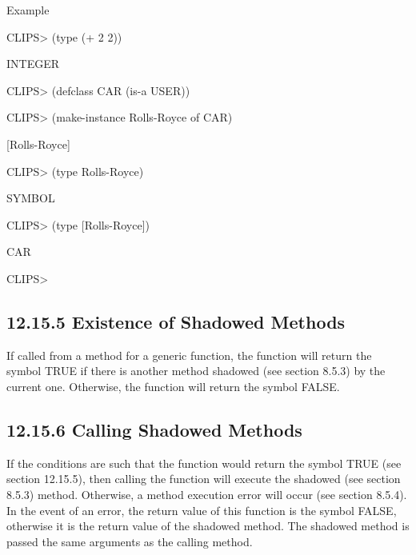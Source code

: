 \documentclass[letterpaper,10pt,english]{sphinxmanual}
\begin{document}

\begin{sphinxVerbatim}[commandchars=\\\{\}]
 
\end{sphinxVerbatim}

Example

CLIPS\textgreater{} (type (+ 2 2))

INTEGER

CLIPS\textgreater{} (defclass CAR (is-a USER))

CLIPS\textgreater{} (make-instance Rolls-Royce of CAR)

{[}Rolls-Royce{]}

CLIPS\textgreater{} (type Rolls-Royce)

SYMBOL

CLIPS\textgreater{} (type {[}Rolls-Royce{]})

CAR

CLIPS\textgreater{}


\subsection{12.15.5 Existence of Shadowed Methods}
\label{\detokenize{actions:existence-of-shadowed-methods}}
If called from a method for a generic function, the function
 will return the symbol TRUE if there is another method
shadowed (see section 8.5.3) by the current one. Otherwise, the function
will return the symbol FALSE.


\begin{sphinxVerbatim}[commandchars=\\\{\}]
\end{sphinxVerbatim}


\subsection{12.15.6 Calling Shadowed Methods}
\label{\detokenize{actions:calling-shadowed-methods}}
If the conditions are such that the function  would
return the symbol TRUE (see section 12.15.5), then calling the function
 will execute the shadowed (see section 8.5.3)
method. Otherwise, a method execution error will occur (see section
8.5.4). In the event of an error, the return value of this function is
the symbol FALSE, otherwise it is the return value of the shadowed
method. The shadowed method is passed the same arguments as the calling
method.
\end{document}
